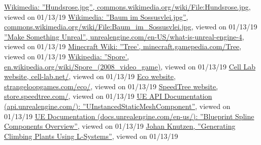 \documentclass[11pt]{scrartcl}
\begin{document}
\begin{thebibliography}{99}
	  \href{https://commons.wikimedia.org/wiki/File:Hundsrose.jpg}{Wikimedia: ''Hundsrose.jpg'', commons.wikimedia.org/wiki/File:Hundsrose.jpg}, viewed on 01/13/19
	 \href{https://commons.wikimedia.org/wiki/File:Baum_im_Sossusvlei.jpg}
	{Wikimedia: ''Baum im Sossusvlei.jpg'', commons.wikimedia.org/wiki/File:Baum\_im\_Sossusvlei.jpg}, viewed on 01/13/19
	  \href{https://www.unrealengine.com/en-US/what-is-unreal-engine-4}{''Make Something Unreal'', unrealengine.com/en-US/what-is-unreal-engine-4}, viewed on 01/13/19
	  \href{https://minecraft.gamepedia.com/Tree}{Minecraft Wiki: ''Tree', minecraft.gamepedia.com/Tree}, viewed on 01/13/19
	  \href{https://en.wikipedia.org/wiki/Spore_(2008_video_game)}{Wikipedia: ''Spore', en.wikipedia.org/wiki/Spore\_(2008\_video\_game)}, viewed on 01/13/19
	  \href{http://cell-lab.net/}{Cell Lab website, cell-lab.net/}, viewed on 01/13/19
	  \href{https://www.strangeloopgames.com/eco/}{Eco website, strangeloopgames.com/eco/}, viewed on 01/13/19
	  \href{https://store.speedtree.com/}{SpeedTree website, store.speedtree.com/}, viewed on 01/13/19
	  \href{https://api.unrealengine.com/INT/API/Runtime/Engine/Components/UInstancedStaticMeshComponent/index.html}{UE API Documentation (api.unrealengine.com/): ''UInstancedStaticMeshComponent''}, viewed on 01/13/19
	  \href{https://docs.unrealengine.com/en-us/Engine/BlueprintSplines/Overview}{UE Documentation (docs.unrealengine.com/en-us/): ''Blueprint Spline Components Overview''}, viewed on 01/13/19
	  \href{http://www.cse.chalmers.se/~uffe/xjobb/climbingplants.pdf}{Johan Knutzen, ''Generating Climbing Plants Using L-Systems''}, viewed on 01/13/19
	
\end{thebibliography}
\end{document}
